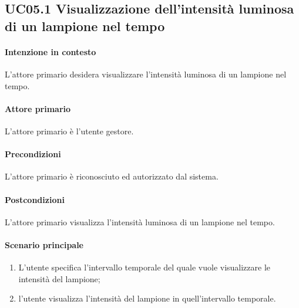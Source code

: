 \subsection{UC05.1 Visualizzazione dell'intensità luminosa di un lampione nel tempo}
\paragraph{Intenzione in contesto} L'attore primario desidera visualizzare l'intensità luminosa di un lampione nel tempo.

\paragraph{Attore primario} L'attore primario è l'utente gestore.
\paragraph{Precondizioni} L'attore primario è riconosciuto ed autorizzato dal sistema.
\paragraph{Postcondizioni} L'attore primario visualizza l'intensità luminosa di un lampione nel tempo.

\paragraph{Scenario principale}
\begin{enumerate}
    \item L'utente specifica l'intervallo temporale del quale vuole visualizzare le intensità del lampione;
    \item l'utente visualizza l'intensità del lampione in quell'intervallo temporale.
\end{enumerate}